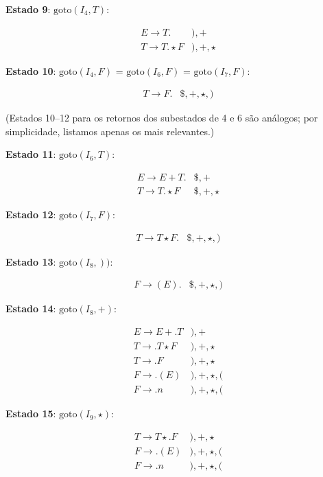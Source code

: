 \textbf{Estado 9}: \(\text{goto}(I_4, T)\):

\[
\begin{array}{ll}
E \to T . & ),+ \\
T \to T . \star F & ),+,\star
\end{array}
\]

\textbf{Estado 10}: \(\text{goto}(I_4, F)\) = \(\text{goto}(I_6,
F)\) = \(\text{goto}(I_7, F)\):

\[
\begin{array}{ll}
T \to F . & \$,+,\star,)
\end{array}
\]

(Estados 10--12 para os retornos dos subestados de 4 e 6 são
análogos; por simplicidade, listamos apenas os mais relevantes.)

\textbf{Estado 11}: \(\text{goto}(I_6, T)\):

\[
\begin{array}{ll}
E \to E + T . & \$,+ \\
T \to T . \star F & \$,+,\star
\end{array}
\]

\textbf{Estado 12}: \(\text{goto}(I_7, F)\):

\[
\begin{array}{ll}
T \to T \star F . & \$,+,\star,)
\end{array}
\]

\textbf{Estado 13}: \(\text{goto}(I_8, ))\):

\[
\begin{array}{ll}
F \to ( E ) . & \$,+,\star,)
\end{array}
\]

\textbf{Estado 14}: \(\text{goto}(I_8, +)\):

\[
\begin{array}{ll}
E \to E + . T & ),+ \\
T \to . T \star F & ),+,\star \\
T \to . F & ),+,\star \\
F \to . ( E ) & ),+,\star,( \\
F \to . n & ),+,\star,(
\end{array}
\]

\textbf{Estado 15}: \(\text{goto}(I_9, \star)\):

\[
\begin{array}{ll}
T \to T \star . F & ),+,\star \\
F \to . ( E ) & ),+,\star,( \\
F \to . n & ),+,\star,(
\end{array}
\]


